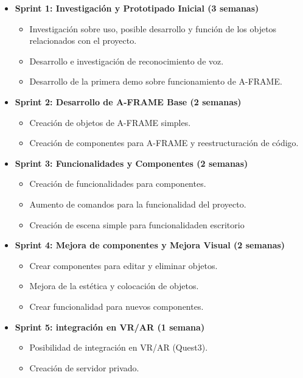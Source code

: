 \documentclass[a4paper, 12pt]{book}
\begin{document}
\begin{itemize}
  \item \textbf{Sprint 1: Investigación y Prototipado Inicial (3 semanas)}
 \begin{itemize}
  \item Investigación sobre uso, posible desarrollo y función de los objetos relacionados con el proyecto.
  \item Desarrollo e investigación de reconocimiento de voz.
  \item Desarrollo de la primera demo sobre funcionamiento de A-FRAME.
 \end{itemize}
 
 \item \textbf{Sprint 2: Desarrollo de A-FRAME Base (2 semanas)}
 \begin{itemize}
  \item Creación de objetos de A-FRAME simples.
  \item Creación de componentes para A-FRAME y reestructuración de código.
 \end{itemize}
 
 \item \textbf{Sprint 3: Funcionalidades y Componentes (2 semanas)}
  \begin{itemize}
   \item Creación de funcionalidades para componentes.
   \item Aumento de comandos para la funcionalidad del proyecto.
   \item Creación de escena simple para funcionalidaden escritorio
  \end{itemize}
 
 \item \textbf{Sprint 4: Mejora de componentes y Mejora Visual (2 semanas)}
  \begin{itemize}
   \item Crear componentes para editar y eliminar objetos.
   \item Mejora de la estética y colocación de objetos.
   \item Crear funcionalidad para nuevos componentes.
  \end{itemize}
 
 \item \textbf{Sprint 5: integración en VR/AR (1 semana)}
  \begin{itemize}
   \item Posibilidad de integración en VR/AR (Quest3).
   \item Creación de servidor privado.
  \end{itemize}
 

\end{itemize}
\end{document}
